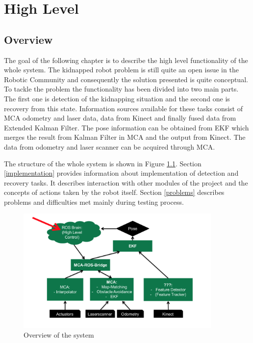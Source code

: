 \chapter{High Level}

\section{Overview}
The goal of the following chapter is to describe the high level functionality of the whole system. The kidnapped robot problem is still quite an open issue in the Robotic Community and consequently the solution presented is quite conceptual. To tackle the problem the functionality has been divided into two main parts. The first one is detection of the kidnapping situation and the second one is recovery from this state. Information sources available for these tasks consist of MCA odometry and laser data, data from Kinect and finally fused data from Extended Kalman Filter. The pose information can be obtained from EKF which merges the result from Kalman Filter in MCA and the output from Kinect. The data from odometry and laser scanner can be acquired through MCA. 

The structure of the whole system is shown in Figure \ref{System}. Section \ref{implementation} provides information about implementation of detection and recovery tasks. It describes interaction with other modules of the project and the concepts of actions taken by the robot itself. Section \ref{problems} describes problems and difficulties met mainly during testing process.

\begin{figure}[ht]
\centering
\includegraphics[width=0.9\textwidth]{graphics/system.png}
\caption{Overview of the system}
\label{System}
\centering
\end{figure}

